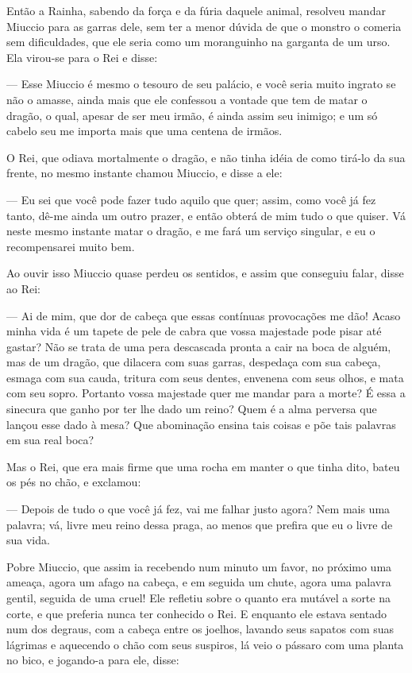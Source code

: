 Então a Rainha, sabendo da força e da fúria daquele animal, resolveu
mandar Miuccio para as garras dele, sem ter a menor dúvida de que o
monstro o comeria sem dificuldades, que ele seria como um moranguinho
na garganta de um urso. Ela virou-se para o Rei e disse: 

— Esse Miuccio é mesmo o tesouro de seu palácio, e você seria muito
ingrato se não o amasse, ainda mais que ele confessou a vontade que
tem de matar o dragão, o qual, apesar de ser meu irmão, é ainda assim
seu inimigo; e um só cabelo seu me importa mais que uma centena de
irmãos.

O Rei, que odiava mortalmente o dragão, e não tinha idéia de como
tirá-lo da sua frente, no mesmo instante chamou Miuccio, e disse a
ele:

— Eu sei que você pode fazer tudo aquilo que quer; assim, como você já
fez tanto, dê-me ainda um outro prazer, e então obterá de mim tudo o
que quiser. Vá neste mesmo instante matar o dragão, e me fará um
serviço singular, e eu o recompensarei muito bem. 

Ao ouvir isso Miuccio quase perdeu os sentidos, e assim que conseguiu
falar, disse ao Rei:

— Ai de mim, que dor de cabeça que essas contínuas provocações me dão!
Acaso minha vida é um tapete de pele de cabra que vossa majestade
pode pisar até gastar? Não se trata de uma pera descascada pronta a
cair na boca de alguém, mas de um dragão, que dilacera com suas
garras, despedaça com sua cabeça, esmaga com sua cauda, tritura com
seus dentes, envenena com seus olhos, e mata com seu sopro. Portanto
vossa majestade quer me mandar para a morte? É essa a sinecura que
ganho por ter lhe dado um reino? Quem é a alma perversa que lançou
esse dado à mesa? Que abominação ensina tais coisas e põe tais
palavras em sua real boca? 

Mas o Rei, que era mais firme que uma rocha em manter o que tinha
dito, bateu os pés no chão, e exclamou:

— Depois de tudo o que você já fez, vai me falhar justo agora? Nem
mais uma palavra; vá, livre meu reino dessa praga, ao menos que
prefira que eu o livre de sua vida.

Pobre Miuccio, que assim ia recebendo num minuto um favor, no próximo
uma ameaça, agora um afago na cabeça, e em seguida um chute, agora
uma palavra gentil, seguida de uma cruel! Ele refletiu sobre o quanto
era mutável a sorte na corte, e que preferia nunca ter conhecido o
Rei. E enquanto ele estava sentado num dos degraus, com a cabeça
entre os joelhos, lavando seus sapatos com suas lágrimas e aquecendo
o chão com seus suspiros, lá veio o pássaro com uma planta no bico, e
jogando-a para ele, disse:

